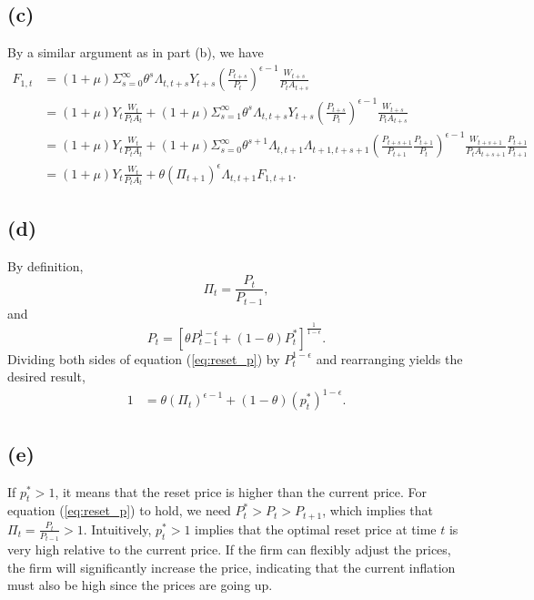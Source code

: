 \documentclass[12pt]{article}
\begin{document}
\subsection*{(c)}

By a similar argument as in part (b), we have
\begin{align*}
\label{eq:F1}
F_{1,t} &=\left(1+\mu\right)\Sigma^{\infty}_{s=0}\theta^{s}\Lambda_{t,t+s}Y_{t+s}\left(\frac{P_{t+s}}{P_{t}}\right)^{\epsilon-1}\frac{W_{t+s}}{P_{t}A_{t+s}} \\
&= \left(1+\mu\right)Y_{t}\frac{W_{t}}{P_{t}A_{t}} + \left(1+\mu\right)\Sigma^{\infty}_{s=1}\theta^{s}\Lambda_{t,t+s}Y_{t+s}\left(\frac{P_{t+s}}{P_{t}}\right)^{\epsilon-1}\frac{W_{t+s}}{P_{t}A_{t+s}} \\
&= \left(1+\mu\right)Y_{t}\frac{W_{t}}{P_{t}A_{t}} + \left(1+\mu\right)\Sigma^{\infty}_{s=0}\theta^{s+1}\Lambda_{t,t+1}\Lambda_{t+1,t+s+1}\left(\frac{P_{t+s+1}}{P_{t+1}}\frac{P_{t+1}}{P_{t}}\right)^{\epsilon-1}\frac{W_{t+s+1}}{P_{t}A_{t+s+1}}\frac{P_{t+1}}{P_{t+1}} \\
&= \left(1+\mu\right)Y_{t}\frac{W_{t}}{P_{t}A_{t}} + \theta\left(\Pi_{t+1}\right)^{\epsilon}\Lambda_{t,t+1}F_{1,t+1}.
\end{align*}

\subsection*{(d)}

By definition, 
\begin{equation}
\label{eq:pi}
\Pi_{t} = \frac{P_{t}}{P_{t-1}},
\end{equation} 
and
\begin{equation}
\label{eq:reset_p}
P_{t} = \left[\theta P^{1-\epsilon}_{t-1} + \left(1-\theta\right)P^{\ast}_{t}\right]^{\frac{1}{1-\epsilon}}.
\end{equation}
Dividing both sides of equation (\ref{eq:reset_p}) by $P^{1-\epsilon}_{t}$ and rearranging yields the desired result,
\begin{align*}
1 &= \theta\left(\Pi_{t}\right)^{\epsilon-1}+\left(1-\theta\right)\left(p^{\ast}_{t}\right)^{1-\epsilon}.
\end{align*}

\subsection*{(e)}

If $p^{\ast}_{t} > 1$, it means that the reset price is higher than the current price. 
For equation (\ref{eq:reset_p}) to hold, we need $P_{t}^{\ast} > P_{t} > P_{t+1}$, which implies that $\Pi_{t}=\frac{P_{t}}{P_{t-1}} > 1$.
Intuitively, $p^{\ast}_{t} > 1$ implies that the optimal reset price at time $t$ is very high relative to the current price. 
If the firm can flexibly adjust the prices, the firm will significantly increase the price, 
indicating that the current inflation must also be high since the prices are going up.
\end{document}
